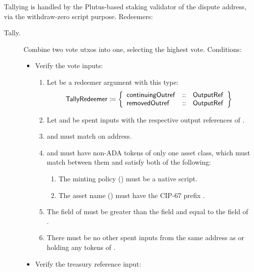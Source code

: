 \documentclass[../hydrozoa.tex]{subfiles}
\begin{document}
Tallying is handled by the Plutus-based staking validator of the dispute address, via the withdraw-zero script purpose.
Redeemers:
\begin{description}
  \item[Tally.] Combine two vote utxos into one, selecting the highest vote.
    Conditions:
    \begin{itemize}
      \item Verify the vote inputs:
        \begin{enumerate}
          \item Let  be a redeemer argument with this type:
            \begin{equation*}
              \mathsf{TallyRedeemer} \coloneq \left\{
              \begin{array}{lll}
                \mathsf{continuingOutref} &::& \mathsf{OutputRef} \\
                \mathsf{removedOutref} &::& \mathsf{OutputRef}
              \end{array}\right\}
            \end{equation*}
          \item Let  and  be spent inputs with the respective output references of .
          \item {} and  must match on address.
          \item {} and  must have non-ADA tokens of only one asset class, which must match between them and satisfy both of the following:
            \begin{enumerate}
              \item The minting policy () must be a native script.
              \item The asset name () must have the CIP-67 prefix \headDisputeToken{}.
            \end{enumerate}
          \item The  field of  must be greater than the  field and equal to the  field of .
          \item There must be no other spent inputs from the same address as  or holding any tokens of .
        \end{enumerate}
      \item Verify the treasury reference input:

\end{itemize}
\end{description}
\end{document}

